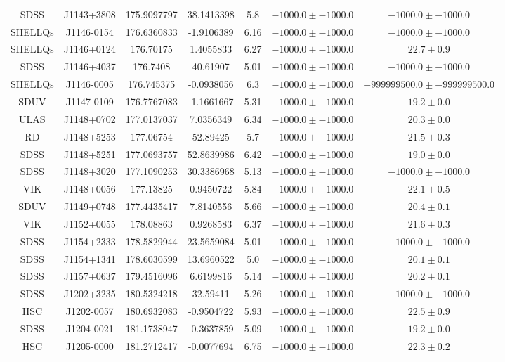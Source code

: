 \begin{table}
\begin{tabular}{ccccccc}
SDSS & J1143+3808 & 175.9097797 & 38.1413398 & 5.8 & $-1000.0\pm-1000.0$ & $-1000.0\pm-1000.0$ \\
SHELLQs & J1146-0154 & 176.6360833 & -1.9106389 & 6.16 & $-1000.0\pm-1000.0$ & $-1000.0\pm-1000.0$ \\
SHELLQs & J1146+0124 & 176.70175 & 1.4055833 & 6.27 & $-1000.0\pm-1000.0$ & $  22.7\pm  0.9$ \\
SDSS & J1146+4037 & 176.7408 & 40.61907 & 5.01 & $-1000.0\pm-1000.0$ & $-1000.0\pm-1000.0$ \\
SHELLQs & J1146-0005 & 176.745375 & -0.0938056 & 6.3 & $-1000.0\pm-1000.0$ & $-999999500.0\pm-999999500.0$ \\
SDUV & J1147-0109 & 176.7767083 & -1.1661667 & 5.31 & $-1000.0\pm-1000.0$ & $  19.2\pm  0.0$ \\
ULAS & J1148+0702 & 177.0137037 & 7.0356349 & 6.34 & $-1000.0\pm-1000.0$ & $  20.3\pm  0.0$ \\
RD & J1148+5253 & 177.06754 & 52.89425 & 5.7 & $-1000.0\pm-1000.0$ & $  21.5\pm  0.3$ \\
SDSS & J1148+5251 & 177.0693757 & 52.8639986 & 6.42 & $-1000.0\pm-1000.0$ & $  19.0\pm  0.0$ \\
SDSS & J1148+3020 & 177.1090253 & 30.3386968 & 5.13 & $-1000.0\pm-1000.0$ & $-1000.0\pm-1000.0$ \\
VIK & J1148+0056 & 177.13825 & 0.9450722 & 5.84 & $-1000.0\pm-1000.0$ & $  22.1\pm  0.5$ \\
SDUV & J1149+0748 & 177.4435417 & 7.8140556 & 5.66 & $-1000.0\pm-1000.0$ & $  20.4\pm  0.1$ \\
VIK & J1152+0055 & 178.08863 & 0.9268583 & 6.37 & $-1000.0\pm-1000.0$ & $  21.6\pm  0.3$ \\
SDSS & J1154+2333 & 178.5829944 & 23.5659084 & 5.01 & $-1000.0\pm-1000.0$ & $-1000.0\pm-1000.0$ \\
SDSS & J1154+1341 & 178.6030599 & 13.6960522 & 5.0 & $-1000.0\pm-1000.0$ & $  20.1\pm  0.1$ \\
SDSS & J1157+0637 & 179.4516096 & 6.6199816 & 5.14 & $-1000.0\pm-1000.0$ & $  20.2\pm  0.1$ \\
SDSS & J1202+3235 & 180.5324218 & 32.59411 & 5.26 & $-1000.0\pm-1000.0$ & $-1000.0\pm-1000.0$ \\
HSC & J1202-0057 & 180.6932083 & -0.9504722 & 5.93 & $-1000.0\pm-1000.0$ & $  22.5\pm  0.9$ \\
SDSS & J1204-0021 & 181.1738947 & -0.3637859 & 5.09 & $-1000.0\pm-1000.0$ & $  19.2\pm  0.0$ \\
HSC & J1205-0000 & 181.2712417 & -0.0077694 & 6.75 & $-1000.0\pm-1000.0$ & $  22.3\pm  0.2$ \\

\end{tabular}
\end{table}
